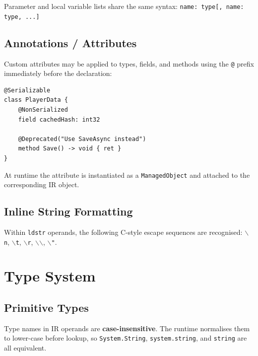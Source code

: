 \documentclass[11pt,a4paper]{article}
\newcommand{\code}[1]{\texttt{\small #1}}
\newcommand{\typename}[1]{\textcolor{typecolor}{\texttt{\small #1}}}
\begin{document}
Parameter and local variable lists share the same syntax:
\code{name: type[, name: type, ...]}

\subsection{Annotations / Attributes}

Custom attributes may be applied to types, fields, and methods using the
\code{@} prefix immediately before the declaration:

\begin{lstlisting}[style=textir]
@Serializable
class PlayerData {
    @NonSerialized
    field cachedHash: int32

    @Deprecated("Use SaveAsync instead")
    method Save() -> void { ret }
}
\end{lstlisting}

At runtime the attribute is instantiated as a \typename{ManagedObject} and
attached to the corresponding IR object.

\subsection{Inline String Formatting}

Within \texttt{ldstr} operands, the following C-style escape sequences are
recognised: \texttt{$\backslash$n}, \texttt{$\backslash$t},
\texttt{$\backslash$r}, \texttt{$\backslash$$\backslash$},
\texttt{$\backslash$"}.

\section{Type System}
\label{sec:types}

\subsection{Primitive Types}

Type names in IR operands are \textbf{case-insensitive}. The runtime
normalises them to lower-case before lookup, so \texttt{System.String},
\texttt{system.string}, and \texttt{string} are all equivalent.
\end{document}
